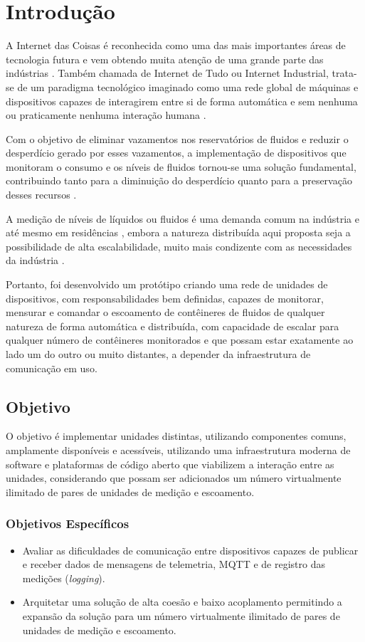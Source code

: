 \section{Introdução}

A Internet das Coisas é reconhecida como uma das mais importantes áreas de tecnologia futura e vem obtendo muita atenção de uma grande parte das indústrias \cite{lee2015internet}. Também chamada de Internet de Tudo ou Internet Industrial, trata-se de um paradigma tecnológico imaginado como uma rede global de máquinas e dispositivos capazes de interagirem entre si \cite{lee2015internet} de forma automática e sem nenhuma ou praticamente nenhuma interação humana \cite{li2006state}.

Com o objetivo de eliminar vazamentos nos reservatórios de fluidos e reduzir o desperdício gerado por esses vazamentos, a implementação de dispositivos que monitoram o consumo e os níveis de fluidos tornou-se uma solução fundamental, contribuindo tanto para a diminuição do desperdício quanto para a preservação desses recursos \cite{gurgel2021sistema}.

A medição de níveis de líquidos ou fluidos é uma demanda comum na indústria e até mesmo em residências \cite{gonccalves2019controle}, embora a natureza distribuída aqui proposta seja a possibilidade de alta escalabilidade, muito mais condizente com as necessidades da indústria \cite{tairaprototipagem}.

Portanto, foi desenvolvido um protótipo criando uma rede de unidades de dispositivos, com responsabilidades bem definidas, capazes de monitorar, mensurar e comandar o escoamento de contêineres de fluidos de qualquer natureza de forma automática e distribuída, com capacidade de escalar para qualquer número de contêineres monitorados e que possam estar exatamente ao lado um do outro ou muito distantes, a depender da infraestrutura de comunicação em uso.

\subsection{Objetivo}
O objetivo é implementar unidades distintas, utilizando componentes comuns, amplamente disponíveis e acessíveis, utilizando uma infraestrutura moderna de software e plataformas de código aberto que viabilizem a interação entre as unidades, considerando que possam ser adicionados um número virtualmente ilimitado de pares de unidades de medição e escoamento.

\subsubsection{Objetivos Específicos}
\begin{itemize}
    \item Avaliar as dificuldades de comunicação entre dispositivos capazes de publicar e receber dados de mensagens de telemetria, MQTT e de registro das medições (\textit{logging}).
    \item Arquitetar uma solução de alta coesão e baixo acoplamento permitindo a expansão da solução para um número virtualmente ilimitado de pares de unidades de medição e escoamento.

\end{itemize}
